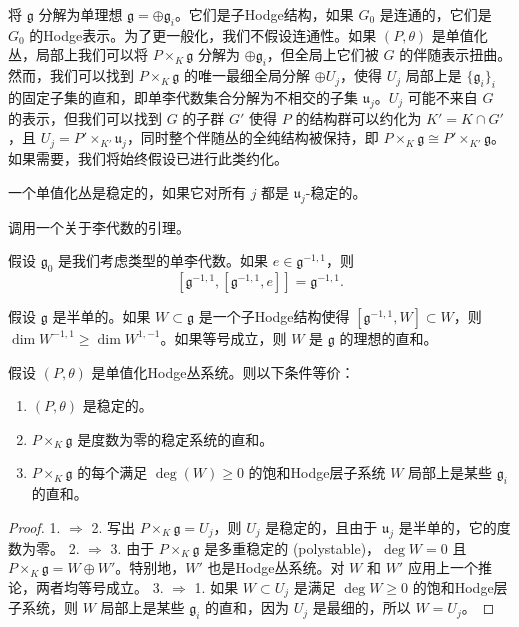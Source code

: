 将 $\mathfrak{g}$ 分解为单理想 $\mathfrak{g} = \oplus \mathfrak{g}_i$。它们是子Hodge结构，如果 $G_0$ 是连通的，它们是 $G_0$ 的Hodge表示。为了更一般化，我们不假设连通性。如果 $(P, \theta)$ 是单值化丛，局部上我们可以将 $P \times_K \mathfrak{g}$ 分解为 $\oplus \mathfrak{g}_i$，但全局上它们被 $G$ 的伴随表示扭曲。然而，我们可以找到 $P \times_K \mathfrak{g}$ 的唯一最细全局分解 $\oplus U_j$，使得 $U_j$ 局部上是 $\{\mathfrak{g}_i\}_i$ 的固定子集的直和，即单李代数集合分解为不相交的子集 $\mathfrak{u}_j$。$U_j$ 可能不来自 $G$ 的表示，但我们可以找到 $G$ 的子群 $G'$ 使得 $P$ 的结构群可以约化为 $K' = K \cap G'$，且 $U_j = P' \times_{K'} \mathfrak{u}_j$，同时整个伴随丛的全纯结构被保持，即 $P \times_K \mathfrak{g} \cong P' \times_{K'} \mathfrak{g}$。如果需要，我们将始终假设已进行此类约化。

\begin{definition}
一个单值化丛是稳定的，如果它对所有 $j$ 都是 $\mathfrak{u}_j$-稳定的。
\end{definition}

调用一个关于李代数的引理。

\begin{lemma}
假设 $\mathfrak{g}_0$ 是我们考虑类型的单李代数。如果 $e \in \mathfrak{g}^{-1,1}$，则
\[ [\mathfrak{g}^{-1,1}, [\mathfrak{g}^{-1,1}, e]] = \mathfrak{g}^{-1,1}. \]
\end{lemma}

\begin{corollary}
假设 $\mathfrak{g}$ 是半单的。如果 $W \subset \mathfrak{g}$ 是一个子Hodge结构使得 $[\mathfrak{g}^{-1,1}, W] \subset W$，则 $\dim W^{-1,1} \ge \dim W^{1,-1}$。如果等号成立，则 $W$ 是 $\mathfrak{g}$ 的理想的直和。
\end{corollary}

\begin{corollary}
假设 $(P, \theta)$ 是单值化Hodge丛系统。则以下条件等价：
\begin{enumerate}
    \item $(P, \theta)$ 是稳定的。
    \item $P \times_K \mathfrak{g}$ 是度数为零的稳定系统的直和。
    \item $P \times_K \mathfrak{g}$ 的每个满足 $\deg(W) \ge 0$ 的饱和Hodge层子系统 $W$ 局部上是某些 $\mathfrak{g}_i$ 的直和。
\end{enumerate}
\end{corollary}

\begin{proof}
1. $\Rightarrow$ 2. 写出 $P \times_K \mathfrak{g} = U_j$，则 $U_j$ 是稳定的，且由于 $\mathfrak{u}_j$ 是半单的，它的度数为零。
2. $\Rightarrow$ 3. 由于 $P \times_K \mathfrak{g}$ 是多重稳定的 (polystable)，$\deg W = 0$ 且 $P \times_K \mathfrak{g} = W \oplus W'$。特别地，$W'$ 也是Hodge丛系统。对 $W$ 和 $W'$ 应用上一个推论，两者均等号成立。
3. $\Rightarrow$ 1. 如果 $W \subset U_j$ 是满足 $\deg W \ge 0$ 的饱和Hodge层子系统，则 $W$ 局部上是某些 $\mathfrak{g}_i$ 的直和，因为 $U_j$ 是最细的，所以 $W = U_j$。
\end{proof}

